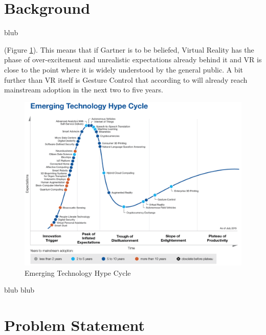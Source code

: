 \section{Background}

blub



(Figure \ref{fig:hypecycle}). This means that if Gartner is to be beliefed, Virtual Reality has the phase of over-excitement and unrealistic expectations already behind it and VR is close to the point where it is widely understood by the general public. A bit further than VR itself is Gesture Control that according to \cite{Gartner2015} will already reach mainstream adoption in the next two to five years.
\begin{figure}[h]
	\begin{center}
		\includegraphics[width=14cm]{03_Figures/03_Gartner/Gartner_EmergingTech2015.png}
		\caption[Emerging Technology Hype Cycle]{Emerging Technology Hype Cycle \citep{Gartner2015b}}
		\label{fig:hypecycle}
	\end{center}
\end{figure}



blub
\cite{Safrudin2015}
blub


\section{Problem Statement}

